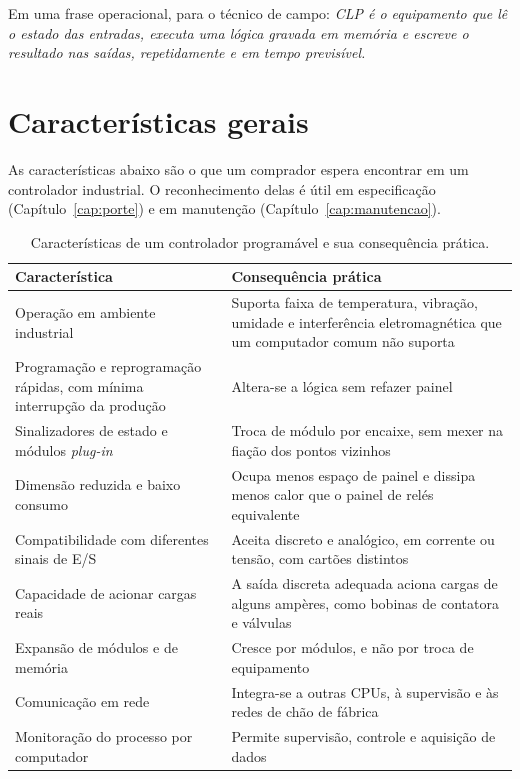 Em uma frase operacional, para o técnico de campo: \emph{CLP é o equipamento que lê o estado das
entradas, executa uma lógica gravada em memória e escreve o resultado nas saídas, repetidamente e em
tempo previsível.}


\section{Características gerais}

As características abaixo são o que um comprador espera encontrar em um controlador industrial. O
reconhecimento delas é útil em especificação (Capítulo~\ref{cap:porte}) e em manutenção
(Capítulo~\ref{cap:manutencao}).

\begin{table}[H]
  \centering
  \caption{Características de um controlador programável e sua consequência prática.}
  \label{tab:caracteristicas}
  \begin{tabular}{p{6.2cm} p{8.4cm}}
    \toprule
    Característica & Consequência prática \\
    \midrule
    Operação em ambiente industrial & Suporta faixa de temperatura, vibração, umidade e
      interferência eletromagnética que um computador comum não suporta \\
    Programação e reprogramação rápidas, com mínima interrupção da produção & Altera-se a lógica sem
      refazer painel \\
    Sinalizadores de estado e módulos \emph{plug-in} & Troca de módulo por encaixe, sem mexer na
      fiação dos pontos vizinhos \\
    Dimensão reduzida e baixo consumo & Ocupa menos espaço de painel e dissipa menos calor que o
      painel de relés equivalente \\
    Compatibilidade com diferentes sinais de E/S & Aceita discreto e analógico, em corrente ou
      tensão, com cartões distintos \\
    Capacidade de acionar cargas reais & A saída discreta adequada aciona cargas de alguns ampères,
      como bobinas de contatora e válvulas \\
    Expansão de módulos e de memória & Cresce por módulos, e não por troca de equipamento \\
    Comunicação em rede & Integra-se a outras CPUs, à supervisão e às redes de chão de fábrica \\
    Monitoração do processo por computador & Permite supervisão, controle e aquisição de dados \\
    \bottomrule
  \end{tabular}
\end{table}


